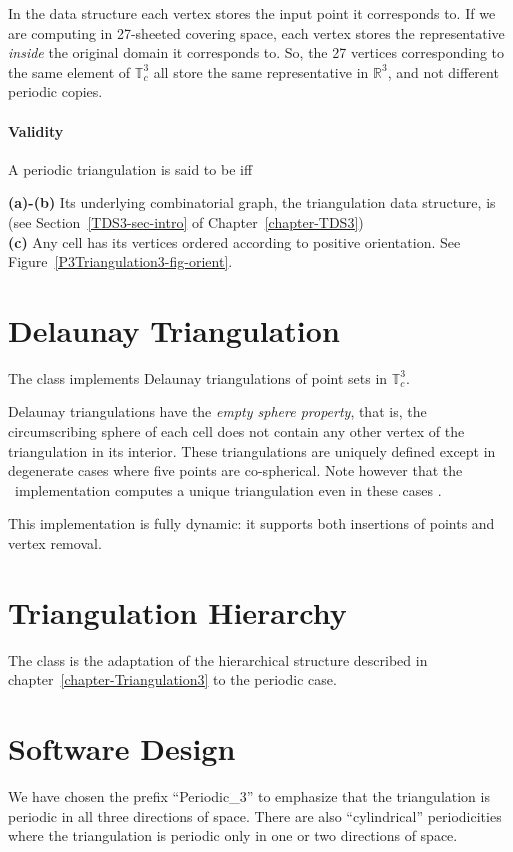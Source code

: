 In the data structure each vertex stores the input point it
corresponds to. If we are computing in 27-sheeted covering 
space, each vertex stores the representative \emph{inside} the
original domain it corresponds to. So, the 27 vertices corresponding
to the same element of $\mathbb T_c^3$ all store the same
representative in $\mathbb R^3$, and not different periodic copies.

\paragraph{Validity}
A periodic triangulation is said to be  iff

{\bf (a)-(b)} Its underlying combinatorial graph, the triangulation
data structure, is  
(see Section~\ref{TDS3-sec-intro} of Chapter~\ref{chapter-TDS3})\\
{\bf (c)} Any cell has its vertices ordered according to positive
orientation. See Figure~\ref{P3Triangulation3-fig-orient}.

\section{Delaunay Triangulation} 
The class  implements Delaunay
triangulations of point sets in $\mathbb T_c^3$.

Delaunay triangulations have the \textit{empty sphere property},
that is, the circumscribing sphere of each cell does not contain any
other vertex of the triangulation in its interior. These
triangulations are uniquely defined except in degenerate cases where
five points are co-spherical.  Note however that the \cgal\
implementation computes a unique triangulation even in these cases
\cite{cgal:dt-pvr3d-03}.

This implementation is fully dynamic: it supports both insertions of
points and vertex removal.

\section{Triangulation Hierarchy}
The class  is the adaptation
of the hierarchical structure described in
chapter~\ref{chapter-Triangulation3} to the periodic case.

\section{Software Design\label{P3Triangulation3-sec-design}}
We have chosen the prefix ``Periodic\_3'' to emphasize that the
triangulation is periodic in all three directions of space. There are
also ``cylindrical'' periodicities where the triangulation is periodic
only in one or two directions of space.


